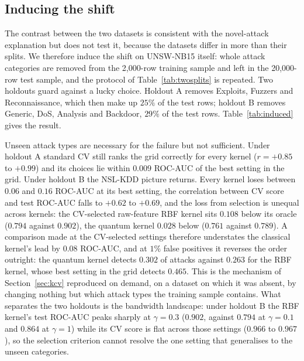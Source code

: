 \subsection{Inducing the shift}\label{sec:kinduced}
The contrast between the two datasets is consistent with the novel-attack explanation but does not test
it, because the datasets differ in more than their splits. We therefore induce the shift on UNSW-NB15
itself: whole attack categories are removed from the 2{,}000-row training sample and left in the
20{,}000-row test sample, and the protocol of Table~\ref{tab:twosplits} is repeated. Two holdouts guard
against a lucky choice. Holdout A removes Exploits, Fuzzers and Reconnaissance, which then make up $25\%$
of the test rows; holdout B removes Generic, DoS, Analysis and Backdoor, $29\%$ of the test rows.
Table~\ref{tab:induced} gives the result.

Unseen attack types are necessary for the failure but not sufficient. Under holdout A standard CV still
ranks the grid correctly for every kernel ($r=+0.85$ to $+0.99$) and its choices lie within $0.009$
ROC-AUC of the best setting in the grid. Under holdout B the NSL-KDD picture returns. Every kernel loses
between $0.06$ and $0.16$ ROC-AUC at its best setting, the correlation between CV score and test ROC-AUC
falls to $+0.62$ to $+0.69$, and the loss from selection is unequal across kernels: the CV-selected
raw-feature RBF kernel sits $0.108$ below its oracle ($0.794$ against $0.902$), the quantum kernel
$0.028$ below ($0.761$ against $0.789$). A comparison made at the CV-selected settings therefore
understates the classical kernel's lead by $0.08$ ROC-AUC, and at $1\%$ false positives it reverses the
order outright: the quantum kernel detects $0.302$ of attacks against $0.263$ for the RBF kernel, whose
best setting in the grid detects $0.465$. This is the mechanism of Section~\ref{sec:kcv} reproduced on
demand, on a dataset on which it was absent, by changing nothing but which attack types the training
sample contains. What separates the two holdouts is the bandwidth landscape: under holdout B the RBF
kernel's test ROC-AUC peaks sharply at $\gamma=0.3$ ($0.902$, against $0.794$ at $\gamma=0.1$ and
$0.864$ at $\gamma=1$) while its CV score is flat across those settings ($0.966$ to $0.967$), so the
selection criterion cannot resolve the one setting that generalises to the unseen categories.

